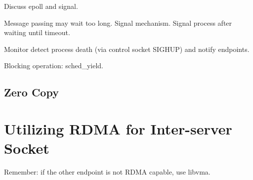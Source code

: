 Discuss epoll and signal.

Message passing may wait too long.
Signal mechanism. Signal process after waiting until timeout.

Monitor detect process death (via control socket SIGHUP) and notify endpoints.

Blocking operation: sched\_yield.


\subsection{Zero Copy}
\label{subsec:zerocopy}




\section{Utilizing RDMA for Inter-server Socket}
\label{sec:rdma}

Remember: if the other endpoint is not RDMA capable, use libvma.
